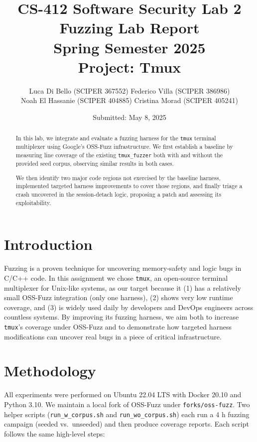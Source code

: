 \documentclass[11pt,a4paper,twocolumn]{article}
\title{%
  CS-412 Software Security Lab 2\\[0.5em]
  \Large Fuzzing Lab Report\\
  Spring Semester 2025\\[0.5em]
  Project: Tmux
}
\author{%
  Luca Di Bello (SCIPER 367552)
  Federico Villa (SCIPER 386986) \\
  Noah El Hassanie (SCIPER 404885)
  Cristina Morad (SCIPER 405241) \\
}
\date{Submitted: May 8, 2025}
\begin{document}
\maketitle

\begin{abstract}
	In this lab, we integrate and evaluate a fuzzing harness for the \texttt{tmux} terminal
	multiplexer using Google’s OSS-Fuzz infrastructure. We first establish a baseline
	by measuring line coverage of the existing \texttt{tmux\_fuzzer} both with and without the
	provided seed corpus, observing similar results in both cases.

	We then identify two major code regions not exercised by the baseline harness, implemented
	targeted harness improvements to cover those regions, and finally triage a crash uncovered
	in the session-detach logic, proposing a patch and assessing its exploitability.
\end{abstract}

\section{Introduction}

Fuzzing is a proven technique for uncovering memory‐safety and logic bugs in C/C++ code. In this assignment we chose \texttt{tmux}, an open-source terminal multiplexer for Unix-like systems, as our target because it (1) has a relatively small OSS-Fuzz integration (only one harness), (2) shows very low runtime coverage, and (3) is widely used daily by developers and DevOps engineers across countless systems.  By improving its fuzzing harness, we aim both to increase \texttt{tmux}’s coverage under OSS-Fuzz and to demonstrate how targeted harness modifications can uncover real bugs in a piece of critical infrastructure.

\section{Methodology}

All experiments were performed on Ubuntu 22.04 LTS with Docker 20.10 and Python 3.10. We maintain a local fork of OSS-Fuzz under \texttt{forks/oss-fuzz}. Two helper scripts (\texttt{run\_w\_corpus.sh} and \texttt{run\_wo\_corpus.sh}) each run a 4 h fuzzing campaign (seeded vs.\ unseeded) and then produce coverage reports. Each script follows the same high-level steps:
\end{document}
